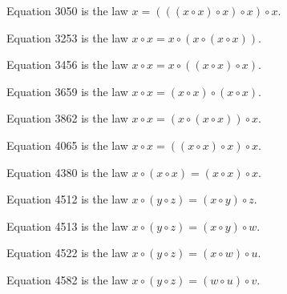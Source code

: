 \begin{definition}[Equation 3050]\label{eq3050}\leanok{}  Equation 3050 is the law $x = (((x \circ x) \circ x) \circ x) \circ x$.
\end{definition}

\begin{definition}[Equation 3253]\label{eq3253}\leanok{}  Equation 3253 is the law $x \circ x = x \circ (x \circ (x \circ x))$.
\end{definition}

\begin{definition}[Equation 3456]\label{eq3456}\leanok{}  Equation 3456 is the law $x \circ x = x \circ ((x \circ x) \circ x)$.
\end{definition}

\begin{definition}[Equation 3659]\label{eq3659}\leanok{}  Equation 3659 is the law $x \circ x = (x \circ x) \circ (x \circ x)$.
\end{definition}

\begin{definition}[Equation 3862]\label{eq3862}\leanok{}  Equation 3862 is the law $x \circ x = (x \circ (x \circ x)) \circ x$.
\end{definition}

\begin{definition}[Equation 4065]\label{eq4065}\leanok{}  Equation 4065 is the law $x \circ x = ((x \circ x) \circ x) \circ x$.
\end{definition}

\begin{definition}[Equation 4380]\label{eq4380}\leanok{}  Equation 4380 is the law $x \circ (x \circ x) = (x \circ x) \circ x$.
\end{definition}

\begin{definition}[Equation 4512]\label{eq4512}\leanok{}  Equation 4512 is the law $x \circ (y \circ z) = (x \circ y) \circ z$.
\end{definition}

\begin{definition}[Equation 4513]\label{eq4513}\leanok{}  Equation 4513 is the law $x \circ (y \circ z) = (x \circ y) \circ w$.
\end{definition}

\begin{definition}[Equation 4522]\label{eq4522}\leanok{}  Equation 4522 is the law $x \circ (y \circ z) = (x \circ w) \circ u$.
\end{definition}

\begin{definition}[Equation 4582]\label{eq4582}\leanok{}  Equation 4582 is the law $x \circ (y \circ z) = (w \circ u) \circ v$.
\end{definition}
